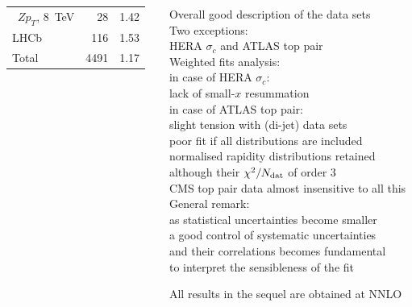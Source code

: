 \documentclass{beamer}
\begin{document}
\begin{frame}
\begin{columns}[c]
\begin{column}{0.5\textwidth}
\begin{tabularx}{\columnwidth}{Xrc}
   \ $Zp_T$, 8~TeV            &   28 & 1.42 \\
   LHCb                       &  116 & 1.53 \\
   \midrule
   Total                      & 4491 & 1.17 \\
   \bottomrule 
   \end{tabularx}
  \end{column}
  \begin{column}{0.5\textwidth}
   \centering
   \footnotesize
   Overall good description of the data sets\\
   \vspace{0.1cm}
   Two exceptions:\\
   HERA $\sigma_c$ and ATLAS top pair\\
   \vspace{0.1cm}
   Weighted fits analysis:\\
   {\scriptsize in case of HERA $\sigma_c$:}\\
   {\scriptsize lack of small-$x$ resummation}\\
   \vspace{0.1cm}
   {\scriptsize in case of ATLAS top pair:\\ slight tension with (di-jet) data sets}\\
   {\scriptsize poor fit if all distributions are included}\\
   {\scriptsize normalised rapidity distributions retained}\\
   {\scriptsize although their $\chi^2/N_{\rm dat}$ of order 3}\\
   {\scriptsize CMS top pair data almost insensitive to all this}\\
   \vspace{0.1cm}
   General remark:\\
   {\scriptsize as statistical uncertainties become smaller}\\
   {\scriptsize a good control of systematic uncertainties}\\ 
   {\scriptsize and their correlations becomes fundamental}\\ 
   {\scriptsize to interpret the sensibleness of the fit}\\
   \vspace{0.2cm}
   \begin{block}{}
    \centering
    {\scriptsize All results in the sequel are obtained at NNLO}\\
   \end{block}
  \end{column}
 \end{columns}
\end{frame}
\end{document}
